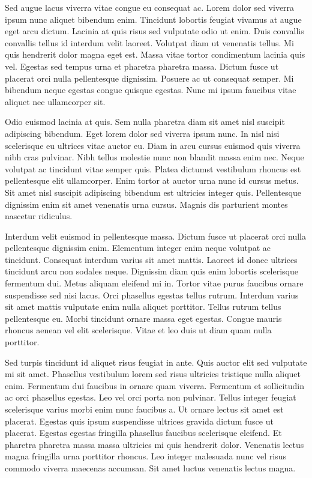 \documentclass[11pt,a4paper]{article}
\begin{document}
Sed augue lacus viverra vitae congue eu consequat ac. Lorem dolor sed viverra ipsum nunc aliquet bibendum enim. Tincidunt lobortis feugiat vivamus at augue eget arcu dictum. Lacinia at quis risus sed vulputate odio ut enim. Duis convallis convallis tellus id interdum velit laoreet. Volutpat diam ut venenatis tellus. Mi quis hendrerit dolor magna eget est. Massa vitae tortor condimentum lacinia quis vel. Egestas sed tempus urna et pharetra pharetra massa. Dictum fusce ut placerat orci nulla pellentesque dignissim. Posuere ac ut consequat semper. Mi bibendum neque egestas congue quisque egestas. Nunc mi ipsum faucibus vitae aliquet nec ullamcorper sit.

Odio euismod lacinia at quis. Sem nulla pharetra diam sit amet nisl suscipit adipiscing bibendum. Eget lorem dolor sed viverra ipsum nunc. In nisl nisi scelerisque eu ultrices vitae auctor eu. Diam in arcu cursus euismod quis viverra nibh cras pulvinar. Nibh tellus molestie nunc non blandit massa enim nec. Neque volutpat ac tincidunt vitae semper quis. Platea dictumst vestibulum rhoncus est pellentesque elit ullamcorper. Enim tortor at auctor urna nunc id cursus metus. Sit amet nisl suscipit adipiscing bibendum est ultricies integer quis. Pellentesque dignissim enim sit amet venenatis urna cursus. Magnis dis parturient montes nascetur ridiculus.

Interdum velit euismod in pellentesque massa. Dictum fusce ut placerat orci nulla pellentesque dignissim enim. Elementum integer enim neque volutpat ac tincidunt. Consequat interdum varius sit amet mattis. Laoreet id donec ultrices tincidunt arcu non sodales neque. Dignissim diam quis enim lobortis scelerisque fermentum dui. Metus aliquam eleifend mi in. Tortor vitae purus faucibus ornare suspendisse sed nisi lacus. Orci phasellus egestas tellus rutrum. Interdum varius sit amet mattis vulputate enim nulla aliquet porttitor. Tellus rutrum tellus pellentesque eu. Morbi tincidunt ornare massa eget egestas. Congue mauris rhoncus aenean vel elit scelerisque. Vitae et leo duis ut diam quam nulla porttitor.

Sed turpis tincidunt id aliquet risus feugiat in ante. Quis auctor elit sed vulputate mi sit amet. Phasellus vestibulum lorem sed risus ultricies tristique nulla aliquet enim. Fermentum dui faucibus in ornare quam viverra. Fermentum et sollicitudin ac orci phasellus egestas. Leo vel orci porta non pulvinar. Tellus integer feugiat scelerisque varius morbi enim nunc faucibus a. Ut ornare lectus sit amet est placerat. Egestas quis ipsum suspendisse ultrices gravida dictum fusce ut placerat. Egestas egestas fringilla phasellus faucibus scelerisque eleifend. Et pharetra pharetra massa massa ultricies mi quis hendrerit dolor. Venenatis lectus magna fringilla urna porttitor rhoncus. Leo integer malesuada nunc vel risus commodo viverra maecenas accumsan. Sit amet luctus venenatis lectus magna.
\end{document}
